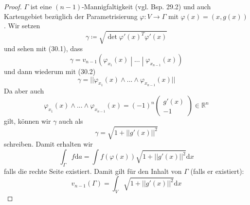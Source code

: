\begin{proof}
$\Gamma$ ist eine $(n-1)$-Mannigfaltigkeit (vgl. Bsp. 29.2) 
und auch Kartengebiet bezüglich der Parametrisierung $\varphi:V\rightarrow\Gamma$ 
mit $\varphi(x)=\left(x,g(x)\right)$. Wir setzen 
\begin{equation*}
	\gamma\coloneqq\sqrt{\det \varphi'(x)^T\varphi'(x)}
\end{equation*}
und sehen mit (30.1), dass
\begin{equation*}
	\gamma=v_{n-1}\left(\varphi_{x_1}(x)\middle|...\middle|\varphi_{x_{n-1}}(x)\right)
\end{equation*}
und dann wiederum mit (30.2)
\begin{equation*}
	\gamma=||\varphi_{x_1}(x)\wedge ... \wedge \varphi_{x_{n-1}}(x)||
\end{equation*}
Da aber auch
\begin{equation*}
	\varphi_{x_1}(x)\wedge ... \wedge \varphi_{x_{n-1}}(x)=(-1)^n\begin{pmatrix}
	g'(x) \\ -1
	\end{pmatrix}\in\mathbb{R}^n
\end{equation*}
gilt, können wir $\gamma$ auch als
\begin{equation*}
	\gamma=\sqrt{1+||g'(x)||^2}
\end{equation*}
schreiben. Damit erhalten wir
\begin{equation*}
	\int_\Gamma f\mathrm{d}a=\int f(\varphi(x))\sqrt{1+||g'(x)||^2}\mathrm{d}x
\end{equation*}
falls die rechte Seite existiert. Damit gilt für den Inhalt von $\Gamma$ (falls er existiert):
\begin{equation}
	v_{n-1}(\Gamma)=\int_V\sqrt{1+||g'(x)||^2}\mathrm{d}x
\end{equation}
\end{proof}

